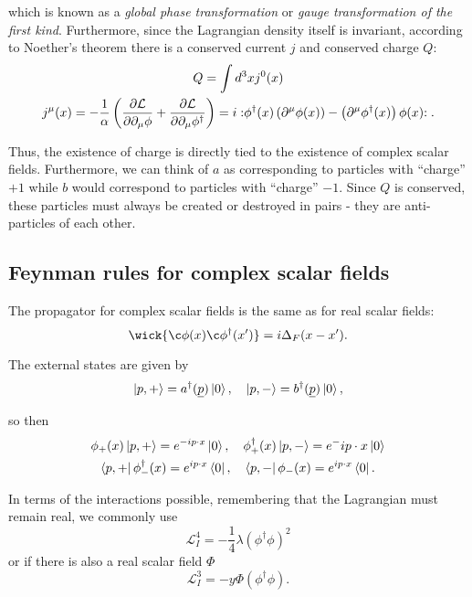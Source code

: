 \documentclass{article}
\numberwithin{equation}{section}
\newcommand{\normord}[1]{:\mathrel{#1}:}
\begin{document}
which is known as a \textit{global phase transformation} or \textit{gauge transformation of the first kind}. Furthermore, since the Lagrangian density itself is invariant, according to Noether's theorem there is a conserved current $j$ and conserved charge $Q$:
\begin{gather}
    Q = \int d^3x j^0(x) \\
    j^\mu(x) = -\frac{1}{\alpha}\left(\pdv{\mathcal{L}}{\partial_\mu\phi} + \pdv{\mathcal{L}}{\partial_\mu\phi^\dagger}\right) = i \normord{\phi^\dagger(x)\left(\partial^\mu \phi(x)\right) - \left(\partial^\mu \phi^\dagger(x)\right)\phi(x)}.
\end{gather}

Thus, the existence of charge is directly tied to the existence of complex scalar fields. Furthermore, we can think of $a$ as corresponding to particles with ``charge'' $+1$ while $b$ would correspond to particles with ``charge'' $-1$. Since $Q$ is conserved, these particles must always be created or destroyed in pairs - they are anti-particles of each other.

\subsection{Feynman rules for complex scalar fields}

The propagator for complex scalar fields is the same as for real scalar fields:
\begin{equation}
    \wick{\c\phi(x)\c\phi^\dagger(x')} = i\Delta_F(x-x').
\end{equation}

The external states are given by 
\begin{equation}
    \ket{p,+} = a^\dagger(\underline{p})\ket{0}, \quad \ket{p,-}=b^\dagger(\underline{p})\ket{0},
\end{equation}

so then
\begin{gather}
    \phi_+(x)\ket{p,+} = e^{-ip\cdot x}\ket{0}, \quad \phi_+^\dagger(x)\ket{p,-} = e^-ip\cdot x \ket{0} \\
    \bra{p,+}\phi_-^\dagger(x)=e^{ip\cdot x} \bra{0}, \quad \bra{p,-} \phi_-(x) = e^{ip\cdot x} \bra{0}.
\end{gather}

In terms of the interactions possible, remembering that the Lagrangian must remain real, we commonly use
\begin{equation}
    \mathcal{L}_I^4 = -\frac{1}{4}\lambda (\phi^\dagger\phi)^2
\end{equation}
or if there is also a real scalar field $\Phi$ 
\begin{equation}
    \mathcal{L}_I^3 = -y\Phi(\phi^\dagger\phi).
\end{equation}
\end{document}
